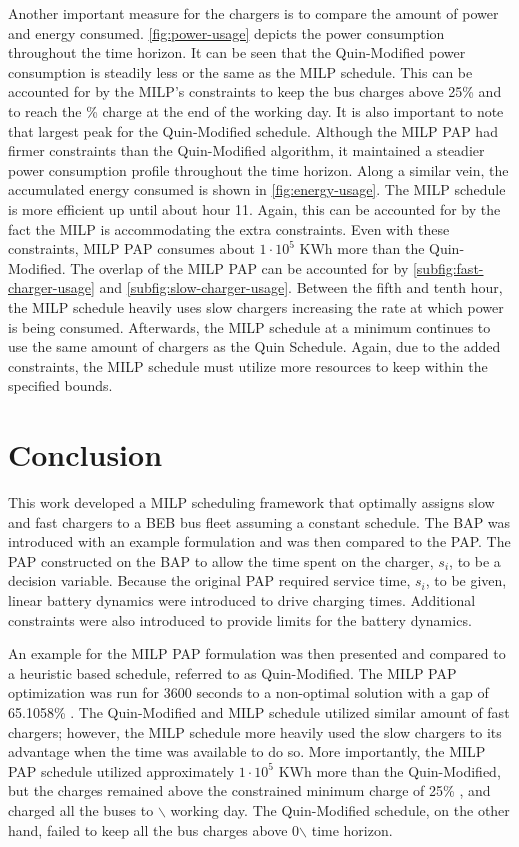 \documentclass[utf8]{FrontiersinHarvard}
\newcommand{\bcharge}{0.7 }                                                     %
\newcommand{\mincharge}{25\% }                                                  %
\newcommand{\timeran}{3600 }                                                    %
\newcommand{\gappercent}{65.1058\% }                                            %
\begin{document}
Another important measure for the chargers is to compare the amount of power and energy consumed.
\autoref{fig:power-usage} depicts the power consumption throughout the time horizon. It can be seen that the
Quin-Modified power consumption is steadily less or the same as the MILP schedule. This can be accounted for by the
MILP's constraints to keep the bus charges above \mincharge and to reach the \fpeval{\bcharge *100}\% charge at the end
of the working day. It is also important to note that largest peak for the Quin-Modified schedule. Although the MILP PAP
had firmer constraints than the Quin-Modified algorithm, it maintained a steadier power consumption profile throughout
the time horizon. Along a similar vein, the accumulated energy consumed is shown in \autoref{fig:energy-usage}. The MILP
schedule is more efficient up until about hour 11. Again, this can be accounted for by the fact the MILP is
accommodating the extra constraints. Even with these constraints, MILP PAP consumes about \(1\cdot10^5\) KWh more than the
Quin-Modified. The overlap of the MILP PAP can be accounted for by \autoref{subfig:fast-charger-usage} and
\autoref{subfig:slow-charger-usage}. Between the fifth and tenth hour, the MILP schedule heavily uses slow chargers
increasing the rate at which power is being consumed. Afterwards, the MILP schedule at a minimum continues to use the
same amount of chargers as the Quin Schedule. Again, due to the added constraints, the MILP schedule must utilize more
resources to keep within the specified bounds.
\section{Conclusion}
\label{sec:conclusion}
This work developed a MILP scheduling framework that optimally assigns slow and fast chargers to a BEB bus fleet
assuming a constant schedule. The BAP was introduced with an example formulation and was then compared to the PAP. The
PAP constructed on the BAP to allow the time spent on the charger, \(s_i\), to be a decision variable. Because the
original PAP required service time, \(s_i\), to be given, linear battery dynamics were introduced to drive charging times.
Additional constraints were also introduced to provide limits for the battery dynamics.

An example for the MILP PAP formulation was then presented and compared to a heuristic based schedule, referred to as
Quin-Modified. The MILP PAP optimization was run for \timeran seconds to a non-optimal solution with a gap of
\gappercent. The Quin-Modified and MILP schedule utilized similar amount of fast chargers; however, the MILP schedule
more heavily used the slow chargers to its advantage when the time was available to do so. More importantly, the MILP
PAP schedule utilized approximately \(1\cdot10^5\) KWh more than the Quin-Modified, but the charges remained above the
constrained minimum charge of \mincharge, and charged all the buses to \fpeval{\bcharge *100}$\backslash$%
working day. The Quin-Modified schedule, on the other hand, failed to keep all the bus charges above 0$\backslash$%
time horizon.
\end{document}
